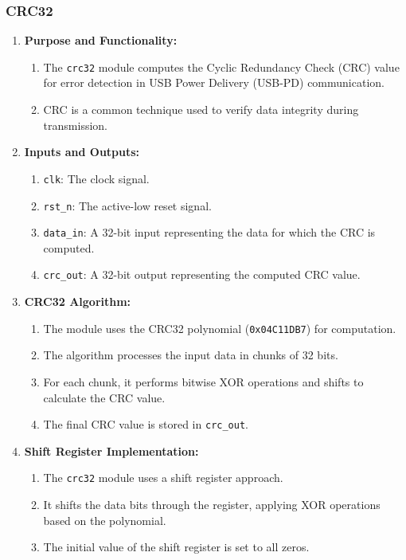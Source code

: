 \subsubsection{CRC32}
\begin{enumerate}
    \item \textbf{Purpose and Functionality:}
    \begin{enumerate}
        \item The \texttt{crc32} module computes the Cyclic Redundancy Check (CRC) value for error detection in USB Power Delivery (USB-PD) communication.
        \item CRC is a common technique used to verify data integrity during transmission.
    \end{enumerate}

    \item \textbf{Inputs and Outputs:}
    \begin{enumerate}
        \item \texttt{clk}: The clock signal.
        \item \texttt{rst\_n}: The active-low reset signal.
        \item \texttt{data\_in}: A 32-bit input representing the data for which the CRC is computed.
        \item \texttt{crc\_out}: A 32-bit output representing the computed CRC value.
    \end{enumerate}

    \item \textbf{CRC32 Algorithm:}
    \begin{enumerate}
        \item The module uses the CRC32 polynomial (\texttt{0x04C11DB7}) for computation.
        \item The algorithm processes the input data in chunks of 32 bits.
        \item For each chunk, it performs bitwise XOR operations and shifts to calculate the CRC value.
        \item The final CRC value is stored in \texttt{crc\_out}.
    \end{enumerate}

    \item \textbf{Shift Register Implementation:}
    \begin{enumerate}
        \item The \texttt{crc32} module uses a shift register approach.
        \item It shifts the data bits through the register, applying XOR operations based on the polynomial.
        \item The initial value of the shift register is set to all zeros.
    \end{enumerate}


\end{enumerate}
